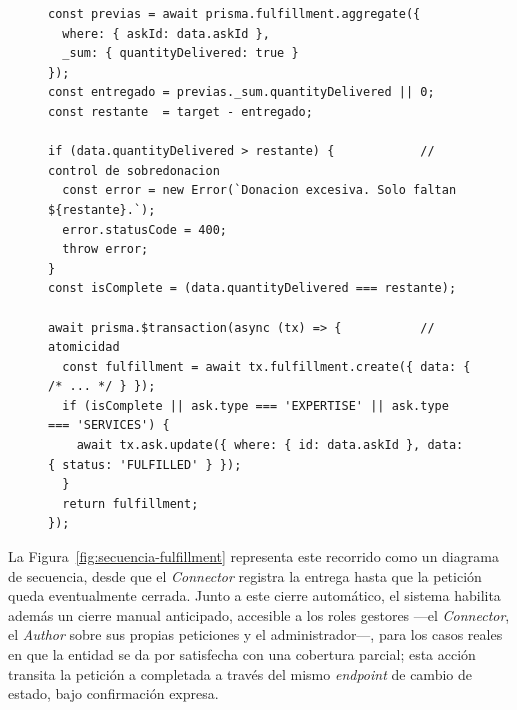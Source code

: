 \documentclass[11pt,oneside,spanish,listoffigures,listoftables]{tfgetsinf}
\begin{document}
\begin{figure}[htbp]
\begin{lstlisting}[caption={Control de sobredonación y cierre automático dentro de una transacción atómica.}, label={lst:fulfillment}]
const previas = await prisma.fulfillment.aggregate({
  where: { askId: data.askId },
  _sum: { quantityDelivered: true }
});
const entregado = previas._sum.quantityDelivered || 0;
const restante  = target - entregado;

if (data.quantityDelivered > restante) {            // control de sobredonacion
  const error = new Error(`Donacion excesiva. Solo faltan ${restante}.`);
  error.statusCode = 400;
  throw error;
}
const isComplete = (data.quantityDelivered === restante);

await prisma.$transaction(async (tx) => {           // atomicidad
  const fulfillment = await tx.fulfillment.create({ data: { /* ... */ } });
  if (isComplete || ask.type === 'EXPERTISE' || ask.type === 'SERVICES') {
    await tx.ask.update({ where: { id: data.askId }, data: { status: 'FULFILLED' } });
  }
  return fulfillment;
});
\end{lstlisting}
\end{figure}

La Figura~\ref{fig:secuencia-fulfillment} representa este recorrido como un diagrama de secuencia, desde que el \textit{Connector} registra la entrega hasta que la petición queda eventualmente cerrada. Junto a este cierre automático, el sistema habilita además un cierre manual anticipado, accesible a los roles gestores —el \textit{Connector}, el \textit{Author} sobre sus propias peticiones y el administrador—, para los casos reales en que la entidad se da por satisfecha con una cobertura parcial; esta acción transita la petición a completada a través del mismo \textit{endpoint} de cambio de estado, bajo confirmación expresa.
\end{document}

